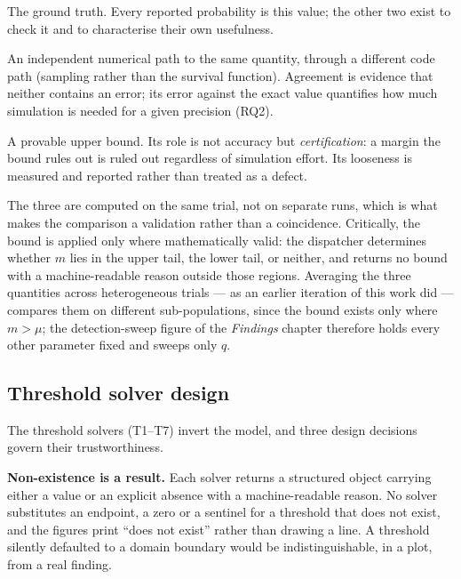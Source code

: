 \begin{description}[leftmargin=1.3em,style=nextline,itemsep=2pt]
\item[Exact binomial.] The ground truth. Every reported probability is
  this value; the other two exist to check it and to characterise their
  own usefulness.
\item[Monte Carlo.] An independent numerical path to the same quantity,
  through a different code path (sampling rather than the survival
  function). Agreement is evidence that neither contains an error;
  its error against the exact value quantifies how much simulation is
  needed for a given precision (RQ2).
\item[Chernoff bound.] A provable upper bound. Its role is not accuracy
  but \emph{certification}: a margin the bound rules out is ruled out
  regardless of simulation effort. Its looseness is measured and
  reported rather than treated as a defect.
\end{description}

The three are computed on the same trial, not on separate runs, which
is what makes the comparison a validation rather than a coincidence.
Critically, the bound is applied only where mathematically valid: the
dispatcher determines whether $m$ lies in the upper tail, the lower
tail, or neither, and returns no bound with a machine-readable reason
outside those regions. Averaging the three quantities across
heterogeneous trials --- as an earlier iteration of this work did ---
compares them on different sub-populations, since the bound exists only
where $m > \mu$; the detection-sweep figure of the \emph{Findings} chapter therefore holds every other
parameter fixed and sweeps only $q$.

\subsection{Threshold solver design}
\label{sec:method-thresholds}

The threshold solvers (T1--T7) invert the model, and three design
decisions govern their trustworthiness.

\textbf{Non-existence is a result.} Each solver returns a structured
object carrying either a value or an explicit absence with a
machine-readable reason. No solver substitutes an endpoint, a zero or a
sentinel for a threshold that does not exist, and the figures print
``does not exist'' rather than drawing a line. A threshold silently
defaulted to a domain boundary would be indistinguishable, in a plot,
from a real finding.


